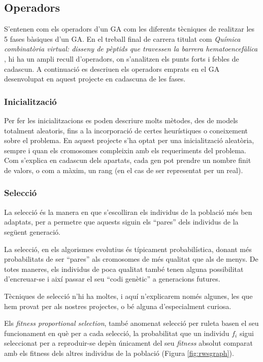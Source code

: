 \subsection{Operadors\label{subsec:operadors}} 

S'entenen com els operadors d'un GA com les diferents tècniques de realitzar les
5 fases bàsiques d'un GA. En el treball final de carrera titulat com
\emph{Química combinatòria virtual: disseny de pèptids que travessen la barrera
hematoencefàlica} \cite{B01},  hi ha un ampli recull d'operadors, on s'analitzen
els punts forts i febles de cadascun.  A continuació es descriuen els operadors
emprats en el GA desenvolupat en aquest projecte en cadascuna de les fases.

\subsubsection{Inicialització} 
\label{ssub:IInicialitzacio}

Per fer les inicialitzacions es poden descriure molts mètodes, des de models
totalment aleatoris, fins a la incorporació de certes heurístiques o coneixement
sobre el problema. En aquest projecte s'ha optat per una inicialització
aleatòria, sempre i quan els cromosomes compleixin amb els requeriments del
problema.  Com s'explica en cadascun dels apartats, cada gen pot prendre un
nombre finit de valors, o com a màxim, un rang (en el cas de ser representat per
un real).

\subsubsection{Selecció}
\label{subs:Iseleccio}
La selecció és la manera en que s'escolliran els individus de la població més
ben adaptats, per a permetre que aquests siguin els ``pares'' dels individus de
la següent generació.

La selecció, en els algorismes evolutius és típicament probabilística, donant
més probabilitats de ser ``pares'' als cromosomes de més qualitat que als de
menys.  De totes maneres, els individus de poca qualitat també tenen alguna
possibilitat d'encreuar-se i així passar el seu ``codi genètic'' a generacions
futures.

Tècniques de selecció n'hi ha moltes, i aquí n'explicarem només algunes, les
que hem provat per als nostres projectes, o bé alguna d'especialment curiosa.

Els \emph{fitness proportional selection}, també anomenat selecció per ruleta
basen el seu funcionament en què per a cada selecció, la probabilitat que un
individu $f_i$ sigui seleccionat per a reproduir-se depèn únicament del seu
\emph{fitness} absolut comparat amb els fitness dels altres individus de la
població (Figura \ref{fig:rwsgraph}).

